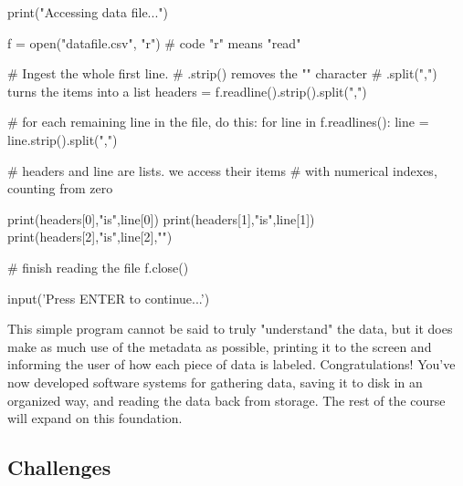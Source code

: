 \documentclass[11pt]{book}
\begin{document}
\begin{pycode}
print("Accessing data file...\n")

f = open("datafile.csv", "r")  # code "r" means "read"

# Ingest the whole first line.
# .strip() removes the "\n" character
# .split(",") turns the items into a list
headers = f.readline().strip().split(",")

# for each remaining line in the file, do this:
for line in f.readlines():
    line = line.strip().split(",")

    # headers and line are lists. we access their items
    # with numerical indexes, counting from zero
    
    print(headers[0],"is",line[0])
    print(headers[1],"is",line[1])
    print(headers[2],"is",line[2],"\n")

# finish reading the file
f.close()

input('Press ENTER to continue...')
\end{pycode}

This simple program cannot be said to truly "understand" the data, but it does make as much use of the metadata as possible, printing it to the screen and informing the user of how each piece of data is labeled.  Congratulations!  You've now developed software systems for gathering data, saving it to disk in an organized way, and reading the data back from storage.  The rest of the course will expand on this foundation.

\subsection*{Challenges}
\end{document}
